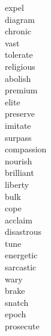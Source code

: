\documentclass[a4paper, 10pt]{ctexart}
\begin{document}
\begin{multicols*}{2}
\begin{description}
\item[expel]

\item[diagram]

\item[chronic]

\item[vast]

\item[tolerate]

\item[religious]

\item[abolish]

\item[premium]

\item[elite]

\item[preserve]

\item[imitate]

\item[surpass]

\item[compassion]

\item[nourish]

\item[brilliant]

\item[liberty]

\item[bulk]

\item[cope]

\item[acclaim]

\item[disastrous]

\item[tune]

\item[energetic]

\item[sarcastic]

\item[wary]

\item[brake]

\item[snatch]

\item[epoch]

\item[prosecute]


\end{description}
\end{multicols*}
\end{document}
